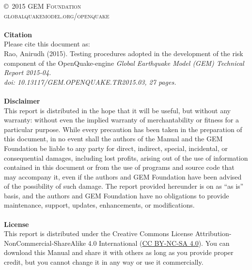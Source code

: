 \documentclass[11pt,fleqn]{book} %
\begin{document}
\noindent \copyright\ \textsc{2015 GEM Foundation}\\ %
\noindent \textsc{globalquakemodel.org/openquake}\\ %
\noindent \hfill\\
\noindent
   {\textbf{Citation}} \hfill \\
   Please cite this document as: \hfill \\
   Rao, Anirudh (2015). 
   Testing procedures adopted in the development of the risk 
   component of the OpenQuake-engine 
   \textit{Global Earthquake Model (GEM) Technical Report 2015-04.\\ 
   doi: 10.13117/GEM.OPENQUAKE.TR2015.03, 27 pages.} \hfill \\
\noindent \hfill\\
\noindent
   {\bf{Disclaimer}} \hfill \\
   This report is distributed in the hope that it will be 
   useful, but without any warranty: without even the implied warranty of 
   merchantability or fitness for a particular purpose. While every precaution 
   has been taken in the preparation of this document, in no event shall the 
   authors of the Manual and the GEM Foundation be liable to any party for 
   direct, indirect, special, incidental, or consequential damages, including 
   lost profits, arising out of the use of information contained in this 
   document or from the use of programs and source code that may accompany it, 
   even if the authors and GEM Foundation have been advised of the possibility 
   of such damage. The report provided hereunder is on as ``as is'' basis, and the 
   authors and GEM Foundation have no obligations to provide maintenance, 
   support, updates, enhancements, or modifications. \hfill \\
\noindent \hfill\\
\noindent
   {\bf{License}} \hfill \\
   This report is distributed under the Creative Commons License 
   Attribution-NonCommercial-ShareAlike 4.0 International 
   (\href{http://creativecommons.org/licenses/by-nc-sa/4.0/}
   {CC BY-NC-SA 4.0}). 
   You can download this Manual and share it with 
   others as long as you provide proper credit, but you cannot change 
   it in any way or use it commercially.\hfill \\
\end{document}
